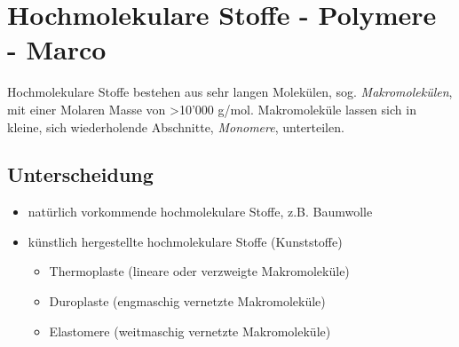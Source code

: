 \section{Hochmolekulare Stoffe - Polymere - Marco}
Hochmolekulare Stoffe bestehen aus sehr langen Molekülen, sog. \emph{Makromolekülen}, mit einer Molaren Masse von >10'000 g/mol. Makromoleküle lassen sich in kleine, sich wiederholende Abschnitte, \emph{Monomere}, unterteilen. \\

\subsection{Unterscheidung}
\begin{itemize}
	\item natürlich vorkommende hochmolekulare Stoffe, z.B. Baumwolle
	\item künstlich hergestellte hochmolekulare Stoffe (Kunststoffe)
		\begin{itemize}
			\item Thermoplaste (lineare oder verzweigte Makromoleküle)
			\item Duroplaste (engmaschig vernetzte Makromoleküle)
			\item Elastomere (weitmaschig vernetzte Makromoleküle)
		\end{itemize}
\end{itemize}

